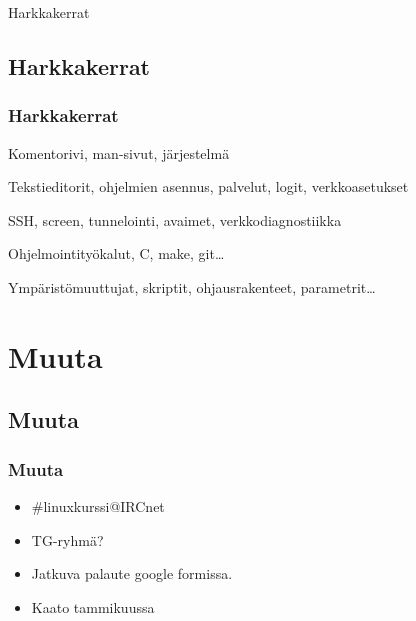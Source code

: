 \documentclass[finnish]{beamer}
\begin{document}
\begin{frame}{Harkkakerrat}
    \subsection{Harkkakerrat}
    \frametitle{Harkkakerrat}
    \begin{block}{10.11}
        Komentorivi, man-sivut, järjestelmä
    \end{block}
    \pause
    \begin{block}{17.11}
        Tekstieditorit, ohjelmien asennus, palvelut, logit, verkkoasetukset
    \end{block}
    \pause
    \begin{block}{22.11}
        SSH, screen, tunnelointi, avaimet, verkkodiagnostiikka
    \end{block}
    \pause
    \begin{block}{29.11}
        Ohjelmointityökalut, C, make, git\ldots
    \end{block}
    \pause
    \begin{block}{1.12}
        Ympäristömuuttujat, skriptit, ohjausrakenteet, parametrit\ldots
    \end{block}

\end{frame}


\section{Muuta}

\begin{frame}
    \subsection{Muuta}
    \frametitle{Muuta}
    \begin{itemize}
        \item \#linuxkurssi@IRCnet
        \item TG-ryhmä?
        \item Jatkuva palaute google formissa.
        \item Kaato tammikuussa
    \end{itemize}
\end{frame}

\end{document}
